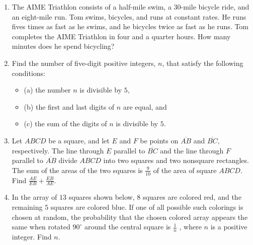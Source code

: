 \documentclass{article}
\begin{document}
\begin{enumerate}[label=\arabic*., itemsep=0.5em]
\item The AIME Triathlon consists of a half-mile swim, a 30-mile bicycle ride, and an eight-mile run. Tom swims, bicycles, and runs at constant rates. He runs fives times as fast as he swims, and he bicycles twice as fast as he runs. Tom completes the AIME Triathlon in four and a quarter hours. How many minutes does he spend bicycling?\par \vspace{0.5em}\item Find the number of five-digit positive integers, \(n\), that satisfy the following conditions:

\begin{itemize}
\item (a) the number \(n\) is divisible by \(5,\)
\end{itemize}


\begin{itemize}
\item (b) the first and last digits of \(n\) are equal, and
\end{itemize}


\begin{itemize}
\item (c) the sum of the digits of \(n\) is divisible by \(5.\)
\end{itemize}
\par \vspace{0.5em}\item Let \(ABCD\) be a square, and let \(E\) and \(F\) be points on \(\overline{AB}\) and \(\overline{BC},\) respectively. The line through \(E\) parallel to \(\overline{BC}\) and the line through \(F\) parallel to \(\overline{AB}\) divide \(ABCD\) into two squares and two nonsquare rectangles. The sum of the areas of the two squares is \(\frac{9}{10}\) of the area of square \(ABCD.\) Find \(\frac{AE}{EB} + \frac{EB}{AE}.\)\par \vspace{0.5em}\item In the array of \(13\) squares shown below, \(8\) squares are colored red, and the remaining \(5\) squares are colored blue. If one of all possible such colorings is chosen at random, the probability that the chosen colored array appears the same when rotated \(90^{\circ}\) around the central square is \(\frac{1}{n}\) , where \(n\) is a positive integer. Find \(n\).



\end{enumerate}
\end{document}
